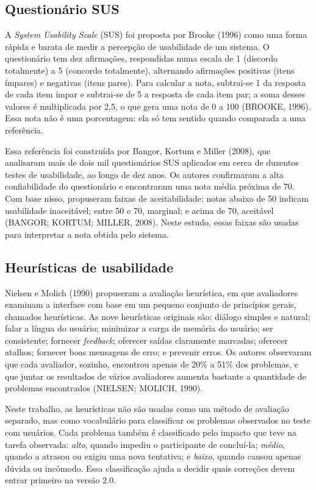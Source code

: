 \documentclass[a4paper,12pt]{article}
\begin{document}
\subsection*{Questionário SUS}

A \emph{System Usability Scale} (SUS) foi proposta por Brooke (1996)
como uma forma rápida e barata de medir a percepção de usabilidade de um
sistema. O questionário tem dez afirmações, respondidas numa escala de 1
(discordo totalmente) a 5 (concordo totalmente), alternando afirmações
positivas (itens ímpares) e negativas (itens pares). Para calcular a
nota, subtrai-se 1 da resposta de cada item ímpar e subtrai-se de 5 a
resposta de cada item par; a soma desses valores é multiplicada por
2,5, o que gera uma nota de 0 a 100 (BROOKE, 1996). Essa nota não é uma
porcentagem: ela só tem sentido quando comparada a uma referência.

Essa referência foi construída por Bangor, Kortum e Miller (2008), que
analisaram mais de dois mil questionários SUS aplicados em cerca de
duzentos testes de usabilidade, ao longo de dez anos. Os autores
confirmaram a alta confiabilidade do questionário e encontraram uma nota
média próxima de 70. Com base nisso, propuseram faixas de
aceitabilidade: notas abaixo de 50 indicam usabilidade inaceitável;
entre 50 e 70, marginal; e acima de 70, aceitável (BANGOR; KORTUM;
MILLER, 2008). Neste estudo, essas faixas são usadas para interpretar a
nota obtida pelo sistema.

\subsection*{Heurísticas de usabilidade}

Nielsen e Molich (1990) propuseram a avaliação heurística, em que
avaliadores examinam a interface com base em um pequeno conjunto de
princípios gerais, chamados heurísticas. As nove heurísticas originais
são: diálogo simples e natural; falar a língua do usuário; minimizar a
carga de memória do usuário; ser consistente; fornecer \emph{feedback};
oferecer saídas claramente marcadas; oferecer atalhos; fornecer boas
mensagens de erro; e prevenir erros. Os autores observaram que cada
avaliador, sozinho, encontrou apenas de 20\% a 51\% dos problemas, e
que juntar os resultados de vários avaliadores aumenta bastante a
quantidade de problemas encontrados (NIELSEN; MOLICH, 1990).

Neste trabalho, as heurísticas não são usadas como um método de
avaliação separado, mas como vocabulário para classificar os problemas
observados no teste com usuários. Cada problema também é classificado
pelo impacto que teve na tarefa observada: \emph{alto}, quando impediu o
participante de concluí-la; \emph{médio}, quando a atrasou ou exigiu uma
nova tentativa; e \emph{baixo}, quando causou apenas dúvida ou
incômodo. Essa classificação ajuda a decidir quais correções devem
entrar primeiro na versão 2.0.
\end{document}
